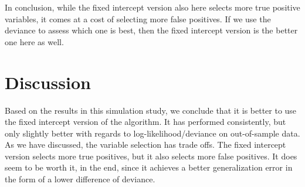 In conclusion, while the fixed intercept version also here selects more true positive variables, it comes at a cost of selecting more false positives.
If we use the deviance to assess which one is best, then the fixed intercept version is the better one here as well.

\section{Discussion}
Based on the results in this simulation study, we conclude that it is better to use the fixed intercept version of the algorithm.
It has performed consistently, but only slightly better with regards to log-likelihood/deviance on out-of-sample data.
As we have discussed, the variable selection has trade offs.
The fixed intercept version selects more true positives, but it also selects more false positives.
It does seem to be worth it, in the end, since it achieves a better generalization error in the form of a lower difference of deviance.

